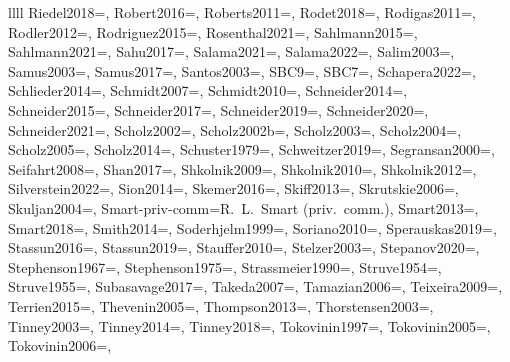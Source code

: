 \documentclass[twocolumn,tighten,twocolappendix]{aastex631}
\begin{document}
\begin{deluxetable*}{llll}
{Riedel2018=\cite{riedel2018},
Robert2016=\cite{robert2016},
Roberts2011=\cite{roberts2011},
Rodet2018=\cite{rodet2018},
Rodigas2011=\cite{rodigas2011},
Rodler2012=\cite{rodler2012},
Rodriguez2015=\cite{rodriguez2015},
Rosenthal2021=\cite{rosenthal2021},
Sahlmann2015=\cite{sahlmann2015},
Sahlmann2021=\cite{sahlmann2021},
Sahu2017=\cite{sahu2017},
Salama2021=\cite{salama2021},
Salama2022=\cite{salama2022},
Salim2003=\cite{salim2003},
Samus2003=\cite{samus2003},
Samus2017=\cite{samus2017},
Santos2003=\cite{santos2003},
SBC9=\cite{pourbaix2004},
SBC7=\cite{batten1978},
Schapera2022=\cite{schapera2022},
Schlieder2014=\cite{schlieder2014},
Schmidt2007=\cite{schmidt2007},
Schmidt2010=\cite{schmidt2010},
Schneider2014=\cite{schneider2014},
Schneider2015=\cite{schneider2015},
Schneider2017=\cite{schneider2017},
Schneider2019=\cite{schneider2019},
Schneider2020=\cite{schneider2020},
Schneider2021=\cite{schneider2021},
Scholz2002=\cite{scholz2002},
Scholz2002b=\cite{scholz2002b},
Scholz2003=\cite{scholz2003},
Scholz2004=\cite{scholz2004},
Scholz2005=\cite{scholz2005},
Scholz2014=\cite{scholz2014},
Schuster1979=\cite{schuster1979},
Schweitzer2019=\cite{schweitzer2019},
Segransan2000=\cite{segransan2000},
Seifahrt2008=\cite{seifahrt2008},
Shan2017=\cite{shan2017},
Shkolnik2009=\cite{shkolnik2009},
Shkolnik2010=\cite{shkolnik2010},
Shkolnik2012=\cite{shkolnik2012},
Silverstein2022=\cite{silverstein2022},
Sion2014=\cite{sion2014},
Skemer2016=\cite{skemer2016},
Skiff2013=\cite{skiff2013},
Skrutskie2006=\cite{skrutskie2006},
Skuljan2004=\cite{skuljan2004},
Smart-priv-comm=R.\ L.\ Smart (priv.\ comm.),
Smart2013=\cite{smart2013},
Smart2018=\cite{smart2018},
Smith2014=\cite{smith2014},
Soderhjelm1999=\cite{soderhjelm1999},
Soriano2010=\cite{soriano2010},
Sperauskas2019=\cite{sperauskas2019},
Stassun2016=\cite{stassun2016},
Stassun2019=\cite{stassun2019},
Stauffer2010=\cite{stauffer2010},
Stelzer2003=\cite{stelzer2003},
Stepanov2020=\cite{stepanov2020},
Stephenson1967=\cite{stephenson1967},
Stephenson1975=\cite{stephenson1975},
Strassmeier1990=\cite{strassmeier1990},
Struve1954=\cite{struve1954},
Struve1955=\cite{struve1955},
Subasavage2017=\cite{subasavage2017},
Takeda2007=\cite{takeda2007},
Tamazian2006=\cite{tamazian2006},
Teixeira2009=\cite{teixeira2009},
Terrien2015=\cite{terrien2015},
Thevenin2005=\cite{thevenin2005},
Thompson2013=\cite{thompson2013},
Thorstensen2003=\cite{thorstensen2003},
Tinney2003=\cite{tinney2003},
Tinney2014=\cite{tinney2014},
Tinney2018=\cite{tinney2018},
Tokovinin1997=\cite{tokovinin1997},
Tokovinin2005=\cite{tokovinin2005},
Tokovinin2006=\cite{tokovinin2006},
}
\end{deluxetable*}
\end{document}
